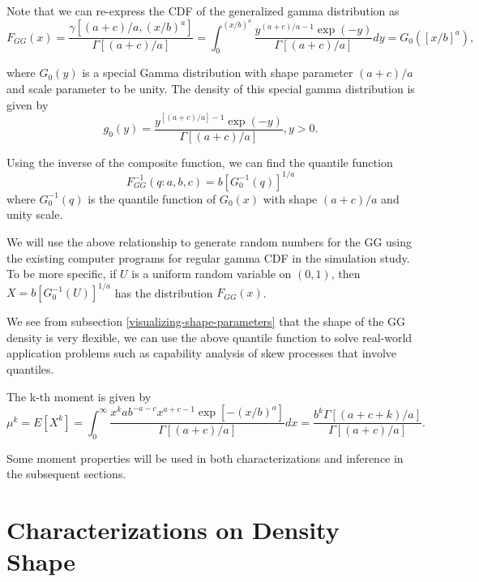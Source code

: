 \documentclass{ps}
\theoremstyle{plain}%
\theoremstyle{definition}
\theoremstyle{remark}
\begin{document}
Note that we can re-express the CDF of the generalized gamma distribution as
\begin{equation}
	F_{GG}(x) = \frac{\gamma \left[(a+c)/a, (x/b)^a \right]}{\Gamma[(a+c)/a]} =\int_0^{(x/b)^a}\frac{y^{(a+c)/a-1}\exp(-y)}{\Gamma[(a+c)/a]}dy = G_0\left( [x/b]^a \right),
\end{equation}

\noindent where $G_0(y)$ is a special Gamma distribution with shape parameter $(a+c)/a$ and scale parameter to be unity. The density of this special gamma distribution is given by
\begin{equation}\label{special-gamma-dist}
	g_0(y) = \frac{y^{[(a+c)/a]-1}\exp(-y)}{\Gamma[(a+c)/a]}, y > 0.
\end{equation}

Using the inverse of the composite function, we can find the quantile function
\begin{equation}\label{quantile-fun}
	F_{GG}^{-1}(q:a,b,c) = b\left[ G_0^{-1}(q) \right]^{1/a}
\end{equation}
\noindent where $ G_0^{-1}(q)$ is the quantile function of $G_0(x)$ with shape $(a+c)/a$ and unity scale.

We will use the above relationship to generate random numbers for the GG using the existing computer programs for regular gamma CDF in the simulation study. To be more specific, if $U$ is a uniform random variable on $(0,1)$, then $X =  b\left[ G_0^{-1}(U) \right]^{1/a}$ has the distribution $F_{GG}(x)$.


We see from subsection \ref{visualizing-shape-parameters} that the shape of the GG density is very flexible, we can use the above quantile function to solve real-world application problems such as capability analysis of skew processes that involve quantiles. 



The k-th moment is given by
\begin{equation}\label{k-th-moment}
	\mu^k = E[X^k] = \int_0^\infty \frac{x^kab^{-a-c}x^{a+c-1}\exp[-(x/b)^a]}{\Gamma[(a+c)/a]}dx = \frac{b^k\Gamma[(a+c+k)/a]}{\Gamma[(a+c)/a]}.
\end{equation}

Some moment properties will be used in both characterizations and inference in the subsequent sections.


\section{Characterizations on  Density Shape}\label{sec03:pdf-shape}
\end{document}
